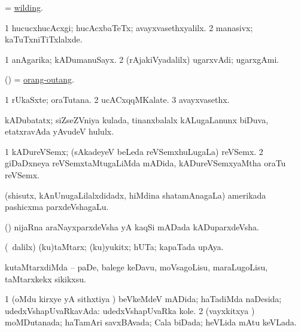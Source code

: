 \bentry
{}
\gl{\nA}
\bmng
= \hyperlink{wilding}{wilding}. 
\emng
\eentry

\bentry
{}
\gl{\kirxvi}
\bmng
\bnum
\num{1} hucucxhucAcxgi; hucAcxbaTeTx; avayxvasethxyalilx. 
\num{2} manasivx; kaTuTxniTiTxlalxde. 
\enum
\emng
\eentry

\bentry
{}
\gl{\nA}
\bmng
\bnum
\num{1} anAgarika; kADumanuSayx. 
\num{2} (rAjakiVyadalilx) ugarxvAdi; ugarxgAmi. 
\enum
\emng

\noindent
\gl{\pagu}
\bmng
{} (\AmA) = \hyperref{kandict_o.pdf}{O}{orang-outang}{orang-outang}. 
\emng
\eentry

\bentry
{}
\gl{\nA}
\bmng
\bnum
\num{1} rUkaSxte; oraTutana. 
\num{2} ucACxqqMKalate. 
\num{3} avayxvasethx. 
\enum
\emng
\eentry

\bentry
{}
\gl{\nA}
\bmng
kADubatatx; siZseZVniya kulada, tinanxbalalx kALugaLanunx biDuva, etatxravAda yAvudeV hululx. 
\emng
\eentry

\bentry
{}
\gl{\nA}
\bmng
\bnum
\num{1} kADureVSemx; (sAkadeyeV beLeda reVSemxhuLugaLa) reVSemx. 
\num{2} giDaDxneya reVSemxtaMtugaLiMda mADida, kADureVSemxyaMtha oraTu reVSemx. 
\enum
\emng
\eentry

\bentry
{}
\gl{\nA}
\bmng
(shisutx, kAnUnugaLilalxdidadx, hiMdina shatamAnagaLa) amerikada pashicxma parxdeVshagaLu. 
\emng
\eentry

\bentry
{}
\gl{\nA}
\bmng
(\kAparx) nijaRna araNayxparxdeVsha yA kaqSi mADada kADuparxdeVsha. 
\emng
\eentry

\bentry
{} 
\gl{\nA}
\expl{}
\bmng
(\sA\ \bava dalilx) (ku)taMtarx; (ku)yukitx; hUTa; kapaTada upAya. 
\emng
\eentry

\bentry
{}
\gl{\sakirx}
\bmng
kutaMtarxdiMda -- paDe, balege keDavu, moVsagoLisu, maraLugoLisu, taMtarxkekx sikikxsu. 
\emng
\eentry

\bentry
{}
\gl{\gu}
\bmng
\bnum
\num{1} (oMdu kirxye yA sithxtiya \vi) beVkeMdeV mADida; haTadiMda naDesida; udedxVshapUvaRkavAda:  udedxVshapUvaRka kole. 
\num{2} (vayxkitxya \vi) moMDutanada; haTamAri savxBAvada; Cala biDada; heVLida mAtu keVLada. 
\enum
\emng
\eentry

